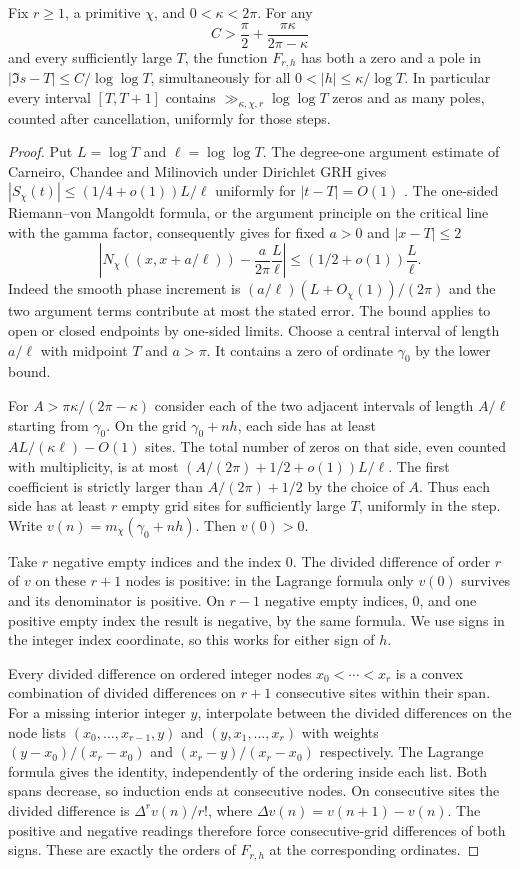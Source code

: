 \begin{theorem}\label{th:micro}
Fix $r\ge1$, a primitive $\chi$, and $0<\kappa<2\pi$. For any
\[
 C>\frac{\pi}{2}+\frac{\pi\kappa}{2\pi-\kappa}
\]
and every sufficiently large $T$, the function $F_{r,h}$ has both a
zero and a pole in $|\Im s-T|\le C/\log\log T$, simultaneously for all
$0<|h|\le\kappa/\log T$. In particular every interval $[T,T+1]$ contains
$\gg_{\kappa,\chi,r}\log\log T$ zeros and as many poles, counted after
cancellation, uniformly for those steps.
\end{theorem}
\begin{proof}
Put $L=\log T$ and $\ell=\log\log T$. The degree-one argument estimate of
Carneiro, Chandee and Milinovich under Dirichlet GRH gives
$|S_\chi(t)|\le(1/4+o(1))L/\ell$ uniformly for $|t-T|=O(1)$
\cite{ccm}. The one-sided Riemann--von Mangoldt formula, or the argument
principle on the critical line with the gamma factor, consequently gives
for fixed $a>0$ and $|x-T|\le2$
\[
 \left|N_\chi((x,x+a/\ell))-\frac{a}{2\pi}\frac{L}{\ell}\right|
       \le(1/2+o(1))\frac{L}{\ell}.
\]
Indeed the smooth phase increment is $(a/\ell)(L+O_\chi(1))/(2\pi)$
and the two argument terms contribute at most the stated error.
The bound applies to open or closed endpoints by one-sided limits.
Choose a central interval of length $a/\ell$ with midpoint $T$ and
$a>\pi$. It contains a zero of ordinate $\gamma_0$ by the lower bound.

For $A>\pi\kappa/(2\pi-\kappa)$ consider each of the two adjacent
intervals of length $A/\ell$ starting from $\gamma_0$. On the grid
$\gamma_0+nh$, each side has at least $A L/(\kappa\ell)-O(1)$ sites.
The total number of zeros on that side, even counted with multiplicity,
is at most $(A/(2\pi)+1/2+o(1))L/\ell$. The first coefficient is
strictly larger than $A/(2\pi)+1/2$ by the choice of $A$. Thus each side
has at least $r$ empty grid sites for sufficiently large $T$, uniformly in
the step. Write $v(n)=m_\chi(\gamma_0+nh)$. Then $v(0)>0$.

Take $r$ negative empty indices and the index $0$. The divided difference
of order $r$ of $v$ on these $r+1$ nodes is positive: in the Lagrange
formula only $v(0)$ survives and its denominator is positive. On $r-1$
negative empty indices, $0$, and one positive empty index the result
is negative, by the same formula. We use signs in the integer index
coordinate, so this works for either sign of $h$.

Every divided difference on ordered integer nodes $x_0<\cdots<x_r$
is a convex combination of divided differences on $r+1$ consecutive
sites within their span. For a missing interior integer $y$, interpolate
between the divided differences on the node lists
$(x_0,\ldots,x_{r-1},y)$ and $(y,x_1,\ldots,x_r)$ with weights
$(y-x_0)/(x_r-x_0)$ and $(x_r-y)/(x_r-x_0)$ respectively.
The Lagrange formula gives the identity, independently of the ordering
inside each list. Both spans decrease, so induction ends at consecutive
nodes. On consecutive sites the divided difference is $\Delta^r v(n)/r!$,
where $\Delta v(n)=v(n+1)-v(n)$. The positive and negative readings
therefore force consecutive-grid differences of both signs. These are
exactly the orders of $F_{r,h}$ at the corresponding ordinates.


\end{proof}
